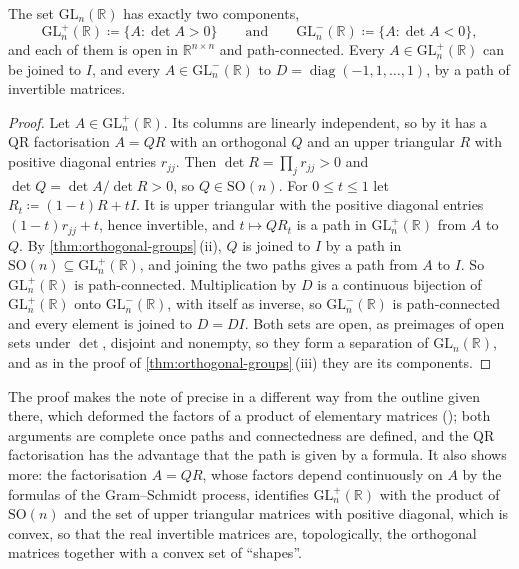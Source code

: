 \begin{theorem}
\label{thm:gl-real}
The set $\mathrm{GL}_n(\mathbb R)$ has exactly two components,
\[
\mathrm{GL}_n^+(\mathbb R)\coloneqq\{A: \det A>0\}\qquad\text{and}\qquad\mathrm{GL}_n^-(\mathbb R)\coloneqq\{A: \det A<0\},
\]
and each of them is open in $\mathbb R^{n\times n}$ and path-connected. Every $A\in\mathrm{GL}_n^+(\mathbb R)$ can be joined to $I$, and every $A\in\mathrm{GL}_n^-(\mathbb R)$ to $D=\operatorname{diag}(-1,1,\ldots,1)$, by a path of invertible matrices.
\end{theorem}

\begin{proof}
Let $A\in\mathrm{GL}_n^+(\mathbb R)$. Its columns are linearly independent, so by  it has a QR factorisation $A=QR$ with an orthogonal $Q$ and an upper triangular $R$ with positive diagonal entries $r_{jj}$. Then $\det R=\prod_jr_{jj}>0$ and $\det Q=\det A/\det R>0$, so $Q\in\mathrm{SO}(n)$. For $0\le t\le1$ let $R_t\coloneqq(1-t)R+tI$. It is upper triangular with the positive diagonal entries $(1-t)r_{jj}+t$, hence invertible, and $t\mapsto QR_t$ is a path in $\mathrm{GL}_n^+(\mathbb R)$ from $A$ to $Q$. By \cref{thm:orthogonal-groups}\,(ii), $Q$ is joined to $I$ by a path in $\mathrm{SO}(n)\subseteq\mathrm{GL}_n^+(\mathbb R)$, and joining the two paths gives a path from $A$ to $I$. So $\mathrm{GL}_n^+(\mathbb R)$ is path-connected. Multiplication by $D$ is a continuous bijection of $\mathrm{GL}_n^+(\mathbb R)$ onto $\mathrm{GL}_n^-(\mathbb R)$, with itself as inverse, so $\mathrm{GL}_n^-(\mathbb R)$ is path-connected and every element is joined to $D=DI$. Both sets are open, as preimages of open sets under $\det$, disjoint and nonempty, so they form a separation of $\mathrm{GL}_n(\mathbb R)$, and as in the proof of \cref{thm:orthogonal-groups}\,(iii) they are its components.
\end{proof}

The proof makes the note of  precise in a different way from the outline given there, which deformed the factors of a product of elementary matrices (); both arguments are complete once paths and connectedness are defined, and the QR factorisation has the advantage that the path is given by a formula. It also shows more: the factorisation $A=QR$, whose factors depend continuously on $A$ by the formulas of the Gram--Schmidt process, identifies $\mathrm{GL}_n^+(\mathbb R)$ with the product of $\mathrm{SO}(n)$ and the set of upper triangular matrices with positive diagonal, which is convex, so that the real invertible matrices are, topologically, the orthogonal matrices together with a convex set of ``shapes''.

